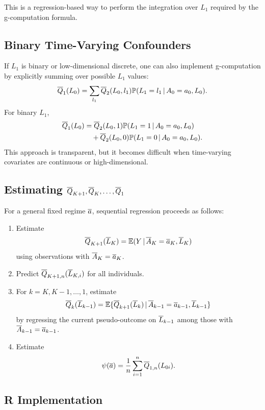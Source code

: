 This is a regression-based way to perform the integration over $L_1$ required by
the g-computation formula.

\subsection{Binary Time-Varying Confounders}

If $L_1$ is binary or low-dimensional discrete, one can also implement
g-computation by explicitly summing over possible $L_1$ values:
\[
  \overline{Q}_1(L_0)
  =
  \sum_{l_1}
  \overline{Q}_2(L_0,l_1)
  \mathbb{P}(L_1=l_1\,\vert\, A_0=a_0,L_0).
\]
For binary $L_1$,
\[
\begin{aligned}
  \overline{Q}_1(L_0)
  &=
  \overline{Q}_2(L_0,1)\mathbb{P}(L_1=1\,\vert\, A_0=a_0,L_0)\\
  &\quad+
  \overline{Q}_2(L_0,0)\mathbb{P}(L_1=0\,\vert\, A_0=a_0,L_0).
\end{aligned}
\]
This approach is transparent, but it becomes difficult when time-varying
covariates are continuous or high-dimensional.

\subsection{Estimating $\overline{Q}_{K+1},\overline{Q}_K,\ldots,\overline{Q}_1$}

For a general fixed regime $\overline{a}$, sequential regression proceeds as follows:
\begin{estimationbox}
\begin{enumerate}
  \item Estimate
  \[
    \overline{Q}_{K+1}(\overline{L}_K)=
    \mathbb{E}(Y\,\vert\, \overline{A}_K=\overline{a}_K,\overline{L}_K)
  \]
  using observations with $\overline{A}_K=\overline{a}_K$.
  \item Predict $\overline{Q}_{K+1,n}(\overline{L}_{K,i})$ for all individuals.
  \item For $k=K,K-1,\ldots,1$, estimate
  \[
    \overline{Q}_k(\overline{L}_{k-1})=
    \mathbb{E}\{\overline{Q}_{k+1}(\overline{L}_k)\,\vert\,
    \overline{A}_{k-1}=\overline{a}_{k-1},\overline{L}_{k-1}\}
  \]
  by regressing the current pseudo-outcome on $\overline{L}_{k-1}$ among those with
  $\overline{A}_{k-1}=\overline{a}_{k-1}$.
  \item Estimate
  \[
    \psi(\overline{a})=\frac{1}{n}\sum_{i=1}^n \overline{Q}_{1,n}(L_{0i}).
  \]
\end{enumerate}
\end{estimationbox}

\subsection{R Implementation}

